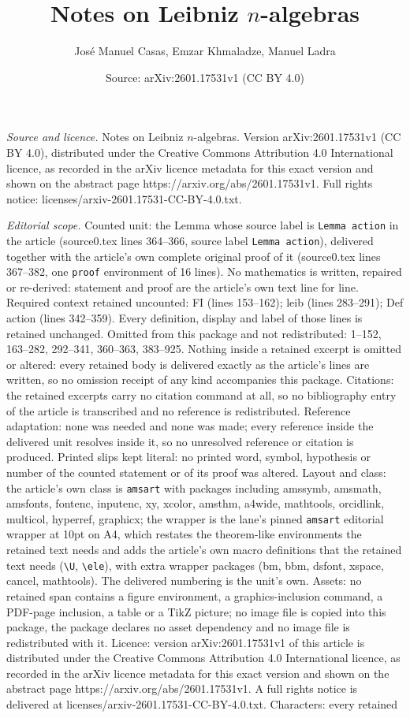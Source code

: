 \documentclass[10pt,a4paper]{amsart}
\title[Notes on Leibniz $n$-algebras]{Notes on Leibniz $n$-algebras}
\author{Jos\'e Manuel Casas, Emzar Khmaladze, Manuel Ladra}
\date{Source: arXiv:2601.17531v1 (CC BY 4.0)}
\begin{document}
\maketitle

\noindent\emph{Source and licence.} Notes on Leibniz $n$-algebras. Version arXiv:2601.17531v1 (CC BY 4.0), distributed under the Creative Commons Attribution 4.0 International licence, as recorded in the arXiv licence metadata for this exact version and shown on the abstract page https://arxiv.org/abs/2601.17531v1. Full rights notice: licenses/arxiv-2601.17531-CC-BY-4.0.txt.\par\smallskip

\noindent\textit{Editorial scope.} Counted unit: the Lemma whose source label is \texttt{Lemma action} in the article (source0.tex lines 364--366, source label \texttt{Lemma action}), delivered together with the article's own complete original proof of it (source0.tex lines 367--382, one \texttt{proof} environment of 16 lines). No mathematics is written, repaired or re-derived: statement and proof are the article's own text line for line. Required context retained uncounted: FI (lines 153--162); leib (lines 283--291); Def action (lines 342--359). Every definition, display and label of those lines is retained unchanged. Omitted from this package and not redistributed: 1--152, 163--282, 292--341, 360--363, 383--925. Nothing inside a retained excerpt is omitted or altered: every retained body is delivered exactly as the article's lines are written, so no omission receipt of any kind accompanies this package. Citations: the retained excerpts carry no citation command at all, so no bibliography entry of the article is transcribed and no reference is redistributed. Reference adaptation: none was needed and none was made; every reference inside the delivered unit resolves inside it, so no unresolved reference or citation is produced. Printed slips kept literal: no printed word, symbol, hypothesis or number of the counted statement or of its proof was altered. Layout and class: the article's own class is \texttt{amsart} with packages including amssymb, amsmath, amsfonts, fontenc, inputenc, xy, xcolor, amsthm, a4wide, mathtools, orcidlink, multicol, hyperref, graphicx; the wrapper is the lane's pinned \texttt{amsart} editorial wrapper at 10pt on A4, which restates the theorem-like environments the retained text needs and adds the article's own macro definitions that the retained text needs (\texttt{\textbackslash U}, \texttt{\textbackslash ele}), with extra wrapper packages (bm, bbm, dsfont, xspace, cancel, mathtools). The delivered numbering is the unit's own. Assets: no retained span contains a figure environment, a graphics-inclusion command, a PDF-page inclusion, a table or a TikZ picture; no image file is copied into this package, the package declares no asset dependency and no image file is redistributed with it. Licence: version arXiv:2601.17531v1 of this article is distributed under the Creative Commons Attribution 4.0 International licence, as recorded in the arXiv licence metadata for this exact version and shown on the abstract page https://arxiv.org/abs/2601.17531v1. A full rights notice is delivered at licenses/arxiv-2601.17531-CC-BY-4.0.txt. Characters: every retained 
\end{document}
